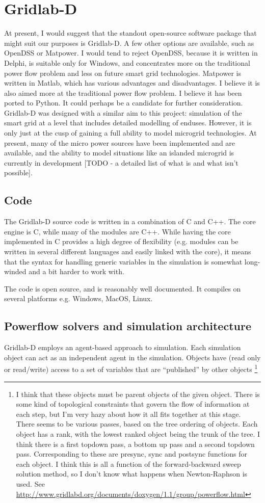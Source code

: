 \documentclass[12pt]{article}
\begin{document}
\section{Gridlab-D} At present, I would suggest that the standout open-source software package that might suit our purposes is Gridlab-D. A few other options are available, such as OpenDSS or Matpower. I would tend to reject OpenDSS, because it is written in Delphi, is suitable only for Windows, and concentrates more on the traditional power flow problem and less on future smart grid technologies. Matpower is written in Matlab, which has various advantages and disadvantages. I believe it is also aimed more at the traditional power flow problem. I believe it has been ported to Python. It could perhaps be a candidate for further consideration.  Gridlab-D was designed with a similar aim to this project: simulation of the smart grid at a level that includes detailed modelling of enduses. However, it is only just at the cusp of gaining a full ability to model microgrid technologies. At present, many of the micro power sources have been implemented and are available, and the ability to model situations like an islanded microgrid is currently in development [TODO - a detailed list of what is and what isn't possible].  
\subsection{Code}
The Gridlab-D source code is written in a combination of C and C++. The core engine is C, while many of the modules are C++. While having the core implemented in C provides a high degree of flexibility (e.g. modules can be written in several different languages and easily linked with the core), it means that the syntax for handling generic variables in the simulation is somewhat long-winded and a bit harder to work with.

The code is open source, and is reasonably well documented. It compiles on several platforms e.g. Windows, MacOS, Linux. 

\subsection{Powerflow solvers and simulation architecture} 
Gridlab-D employs an agent-based approach to simulation.  Each simulation object can act as an independent agent in the simulation. Objects have (read only or read/write) access to a set of variables that are ``published'' by other objects \footnote{I think that these objects must be parent objects of the given object.  There is some kind of topological
constraints that govern the flow of information at each step, but I'm very hazy about how it all fits together at this stage. There seems to be various passes, based on the tree ordering of objects.  Each object has a rank, with the lowest ranked object being the trunk of the tree. I think there is a first topdown pass, a bottom up pass and a second topdown pass. Corresponding to these are presync, sync and postsync functions for each object. I think this is all a function of the forward-backward sweep solution method, so I don't know what happens when Newton-Raphson is used. See \url{http://www.gridlabd.org/documents/doxygen/1.1/group/powerflow.html}}
\end{document}
